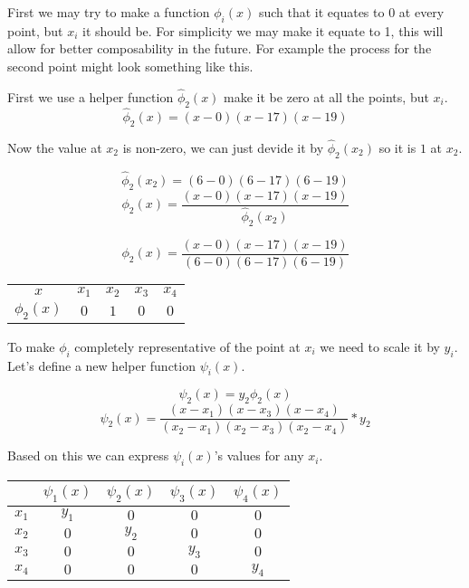 \documentclass[12pt, titlepage]{article}
\begin{document}
First we may try to make a function $\phi_i(x)$ such that it equates to 0 at
every point, but $x_i$ it should be. For simplicity we may make it equate to 1, this will
allow for better composability in the future. For example the process for the second point
might look something like this.

First we use a helper function $\hat{\phi}_2(x)$ make it be zero at all the points, but $x_i$.
\begin{equation}
    \hat{\phi}_2(x) = (x - 0)(x - 17)(x - 19)
\end{equation}

Now the value at $x_2$ is non-zero, we can just devide it by $\hat{\phi}_2(x_2)$ 
so it is $1$ at $x_2$.

\begin{equation}
    \hat{\phi}_2(x_2) = (6 - 0)(6 - 17)(6 - 19)
\end{equation}
\begin{equation}
    \phi_2(x) = \frac{(x - 0)(x - 17)(x - 19)}{\hat{\phi}_2(x_2)}
\end{equation}

\begin{equation}
    \phi_2(x) = \frac{(x - 0)(x - 17)(x - 19)}{(6 - 0)(6 - 17)(6 - 19)}
\end{equation}

{
\centering
\begin{tabular}{c|c c c c}
    $x$ & $x_1$ & $x_2$ & $x_3$ & $x_4$ \\
    $\phi_2(x)$ & $0$ & $1$ & $0$ & $0$ \\
\end{tabular}\par
}

To make $\phi_i$ completely representative of the point at $x_i$ we need to 
scale it by $y_i$. Let's define a new helper function $\psi_i(x)$.

\begin{equation}
    \psi_2(x) = y_2 \phi_2(x)
\end{equation}
\begin{equation}
    \psi_2(x) = \frac{(x - x_1)(x - x_3)(x - x_4)}{(x_2 - x_1)(x_2 - x_3)(x_2 - x_4)} * y_2
\end{equation}

Based on this we can express $\psi_i(x)$'s values for any $x_i$.

{
\centering
\begin{tabular}{c|c c c c}
    & $\psi_1(x) $ & $\psi_2(x)$ & $\psi_3(x)$ & $\psi_4(x)$ \\
    \hline
    $x_1$ & $y_1$ & $0$ & $0$ & $0$ \\
    $x_2$ & $0$ & $y_2$ & $0$ & $0$ \\
    $x_3$ & $0$ & $0$ & $y_3$ & $0$ \\
    $x_4$ & $0$ & $0$ & $0$ & $y_4$ \\
\end{tabular}\par
}
\end{document}
